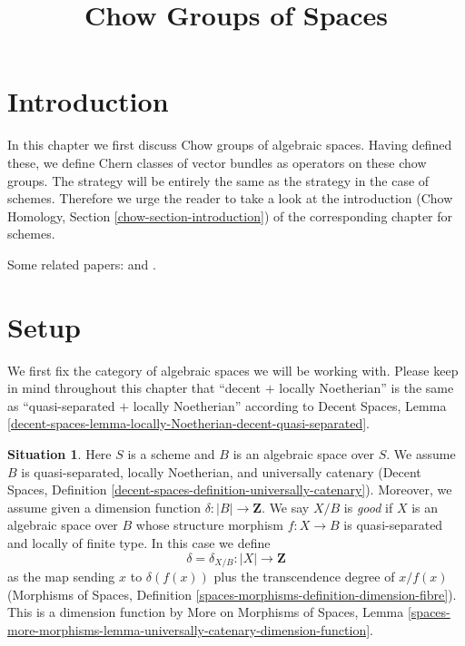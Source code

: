 \documentclass{stacks-project}
\theoremstyle{plain}
\theoremstyle{definition}
\newtheorem{situation}[subsection]{Situation}
\theoremstyle{remark}
\numberwithin{equation}{subsection}
\begin{document}
\title{Chow Groups of Spaces}

\maketitle

\label{section-phantom}


\tableofcontents


\section{Introduction}
\label{section-introduction}

\noindent
In this chapter we first discuss Chow groups of algebraic spaces.
Having defined these, we define Chern classes of vector bundles as
operators on these chow groups. The strategy will be entirely
the same as the strategy in the case of schemes. Therefore we
urge the reader to take a look at the introduction
(Chow Homology, Section \ref{chow-section-introduction})
of the corresponding chapter for schemes.

\medskip\noindent
Some related papers: \cite{edidin-graham} and \cite{kresch_cycle}.



\section{Setup}
\label{section-setup}

\noindent
We first fix the category of algebraic spaces we will be working with.
Please keep in mind throughout this chapter that
``decent $+$ locally Noetherian'' is the same as
``quasi-separated $+$ locally Noetherian'' according to
Decent Spaces, Lemma
\ref{decent-spaces-lemma-locally-Noetherian-decent-quasi-separated}.

\begin{situation}
\label{situation-setup}
Here $S$ is a scheme and $B$ is an algebraic space over $S$.
We assume $B$ is quasi-separated, locally Noetherian, and
universally catenary (Decent Spaces, Definition
\ref{decent-spaces-definition-universally-catenary}).
Moreover, we assume given a dimension function
$\delta : |B| \longrightarrow \mathbf{Z}$.
We say $X/B$ is {\it good} if $X$ is an algebraic space
over $B$ whose structure morphism $f : X \to B$ is
quasi-separated and locally of finite type.
In this case we define
$$
\delta = \delta_{X/B} : |X| \longrightarrow \mathbf{Z}
$$
as the map sending $x$ to $\delta(f(x))$ plus the transcendence degree
of $x/f(x)$ (Morphisms of Spaces, Definition
\ref{spaces-morphisms-definition-dimension-fibre}).
This is a dimension function by
More on Morphisms of Spaces, Lemma
\ref{spaces-more-morphisms-lemma-universally-catenary-dimension-function}.
\end{situation}
\end{document}
